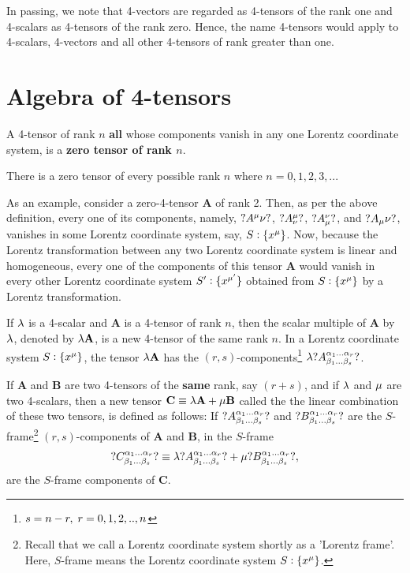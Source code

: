 In passing, we note that 4-vectors are regarded as  
4-tensors of the rank one and 4-scalars as 4-tensors of 
the rank zero. Hence, the name 4-tensors would apply to 
4-scalars, 4-vectors and all other 4-tensors of rank 
greater than one.

\section{Algebra of 4-tensors}

 

 A 4-tensor of rank $n$ \textbf{all} whose
components vanish in any one Lorentz coordinate 
system, is a \textbf{zero tensor of rank $n$}.

There is a zero tensor of every possible rank 
$n$ where $n=0,1,2,3,.. $.

As an example, consider a zero-4-tensor $\mathbf{A}$ 
of rank 2. Then, as per the above definition, every one 
of 
its components, namely,  $?A^{{\mu}}{\nu}?$, 
$?A^{{\mu}}_{{\nu}}?$, $?A_{{\mu}}^{{\nu}}?$,   and $?A_{{\mu}}{\nu}?$, 
vanishes in some Lorentz coordinate system, say,  
$S:\{x^{{\mu}}\}$. 
Now, because the Lorentz transformation 
between any two Lorentz coordinate system is linear 
and homogeneous, every one of the components 
of this tensor $\mathbf{A}$ would vanish in every other 
Lorentz coordinate system $S':\{x^{{\mu'}}\}$ obtained 
from $S:\{x^{{\mu}}\}$ by a Lorentz transformation. 

If $ {\lambda} $ is a 4-scalar and $\mathbf{A}$ is a  
4-tensor of rank $n$, then the scalar multiple of 
$\mathbf{A}$ by ${\lambda}$, denoted by ${\lambda}\mathbf{A}$, is 
a new 4-tensor of the same rank $n$. In a Lorentz 
coordinate system $S:\{x^{{\mu}}\}$, the tensor 
${\lambda}\mathbf{A}$ has the 
$(r,s)$-components\footnote{$s=n-r,\;r=0,1,2,.., n$} 
${\lambda} ?A^{{{\alpha}_1}\dots {\ensuremath{{\alpha}}_r}}_{{{\beta}_1}\dots 
{\ensuremath{{\beta}}_s}}?$.

 If $\mathbf{A}$ and $ \mathbf{B}$ 
are two  4-tensors of the \textbf{same} rank, say 
$(r+s)$, and if ${\lambda}$ and ${\mu}$ are two 4-scalars, 
then a new 
tensor  $\mathbf{C}\equiv {\lambda}\mathbf{A} + {\mu} 
\mathbf{B}$ called the  the linear 
combination of these two tensors, is defined 
as follows: If 
$?A^{{{\alpha}_1}\dots {\ensuremath{{\alpha}}_r}}_{{{\beta}_1}\dots {\ensuremath{{\beta}}_s}}?$ 
and $?B^{{{\alpha}_1}\dots {\ensuremath{{\alpha}}_r}}_{{{\beta}_1}\dots 
{\ensuremath{{\beta}}_s}}?$ are the $S$-frame\footnote{Recall that we 
call a Lorentz coordinate system shortly as a 'Lorentz 
frame'. Here, $S$-frame means  the Lorentz coordinate 
system $S: \{x^{{\mu}}\}$.}  $(r,s)$-components of 
$\mathbf{A}$ and $\mathbf{B}$, in the $S$-frame
\begin{align*}
?C^{{{\alpha}_1}\dots {\ensuremath{{\alpha}}_r}}_{{{\beta}_1}\dots 
{\ensuremath{{\beta}}_s}}? \equiv
{\lambda} ?A^{{{\alpha}_1}\dots {\ensuremath{{\alpha}}_r}}_{{{\beta}_1}\dots 
{\ensuremath{{\beta}}_s}}? +
{\mu} ?B^{{{\alpha}_1}\dots {\ensuremath{{\alpha}}_r}}_{{{\beta}_1}\dots
{\ensuremath{{\beta}}_s}}?,
\end{align*}
are the $S$-frame components of $\mathbf{C}$.

